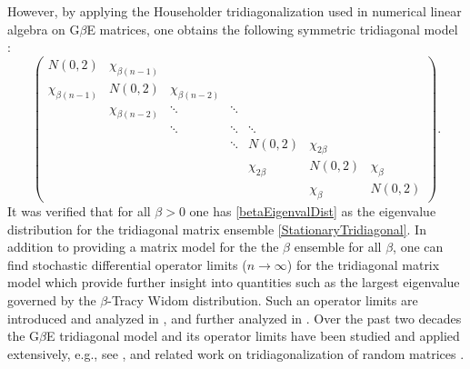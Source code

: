 \documentclass{amsart}
\numberwithin{equation}{section}
\newcommand{\R}{\mathbb{R}}
\begin{document}

However, by applying the Householder tridiagonalization used in numerical linear algebra \cite{bauer1959sequential,wilkinson1962householder} on G$\beta$E matrices, one obtains the following symmetric tridiagonal model \cite{DuEd02}:
\begin{equation}\label{StationaryTridiagonal}
    \begin{pmatrix}
        N(0,2) & \chi_{\beta (n-1)} &  &  &   &  &  \\
        \chi_{\beta (n-1)} &  N(0,2) & \chi_{\beta (n-2)} &  & &  & \\
         &  \chi_{\beta(n-2)}& \ddots & \ddots &  &  &  \\
         & & \ddots & \ddots & \ddots & & \\
         & & & \ddots & N(0, 2) & \chi_{2\beta} &\\ 
         &  &  &  & \chi_{2\beta} & N(0,2) & \chi_{\beta}\\
          &  &  &  &  & \chi_{\beta} & N(0,2)
    \end{pmatrix}.
\end{equation}
It was verified \cite{DuEd02} that for all $\beta >0$ one has \eqref{betaEigenvalDist} as the eigenvalue distribution for the tridiagonal matrix ensemble \eqref{StationaryTridiagonal}.  In addition to providing a matrix model for the the $\beta$ ensemble for all $\beta$, one can find stochastic differential operator limits ($n\to\infty$) for the tridiagonal matrix model which provide further insight into quantities such as the largest eigenvalue governed by the $\beta$-Tracy Widom distribution. Such an operator limits are introduced and analyzed in \cite{Ed04,EdSu07}, and further analyzed in \cite{ramirez2011beta}. Over the past two decades the G$\beta$E tridiagonal model and its operator limits have been studied and applied extensively, e.g., see \cite{dumitriu2006global, li2010beta,dumitriu2012global,AlGu13,allez2014tracy,krishnapur2016universality,valko2017sine,HoPa17,gorin2018stochastic,LambertPaquette03,paquette2023universality,trogdon2024computing}, and related work on tridiagonalization of random matrices \cite{deift2021conjugate,ding2022conjugate}.
\end{document}
